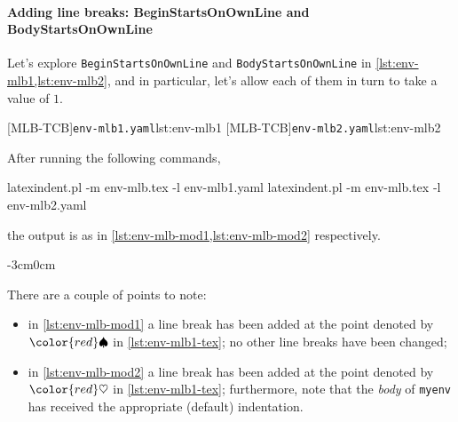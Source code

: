 \documentclass[10pt]{article}
\newenvironment{widepage}{\begin{adjustwidth}{-3cm}{0cm}}{\end{adjustwidth}}
\newcommand{\BeginStartsOnOwnLine}{\color{red}\spadesuit}
\newcommand{\BodyStartsOnOwnLine}{\color{red}\heartsuit}
\begin{document}
 \paragraph{Adding line breaks: BeginStartsOnOwnLine and BodyStartsOnOwnLine}
  \begin{example}
  Let's explore \texttt{BeginStartsOnOwnLine} and \texttt{BodyStartsOnOwnLine} in
  \cref{lst:env-mlb1,lst:env-mlb2}, and in particular, let's allow each of them in turn
  to take a value of $1$.  

  \begin{cmhtcbraster}
   [MLB-TCB]{\texttt{env-mlb1.yaml}}{lst:env-mlb1}
   [MLB-TCB]{\texttt{env-mlb2.yaml}}{lst:env-mlb2}
  \end{cmhtcbraster}

  After running the following commands, 

  \begin{commandshell}
latexindent.pl -m env-mlb.tex -l env-mlb1.yaml
latexindent.pl -m env-mlb.tex -l env-mlb2.yaml
\end{commandshell}

  the output is as in \cref{lst:env-mlb-mod1,lst:env-mlb-mod2} respectively.

  \begin{widepage}
   \begin{minipage}{.56\linewidth}
   \end{minipage}
   \hfill
   \begin{minipage}{.43\linewidth}
   \end{minipage}
  \end{widepage}

  There are a couple of points to note:
  \begin{itemize}
   \item in \cref{lst:env-mlb-mod1} a line break has been added at the point denoted by
         $\BeginStartsOnOwnLine$ in \cref{lst:env-mlb1-tex}; no other line breaks have
         been changed;
   \item in \cref{lst:env-mlb-mod2} a line break has been added at the point denoted by
         $\BodyStartsOnOwnLine$ in \cref{lst:env-mlb1-tex}; furthermore, note that the
         \emph{body} of \texttt{myenv} has received the appropriate (default)
         indentation.
  \end{itemize}
  \end{example}
\end{document}
